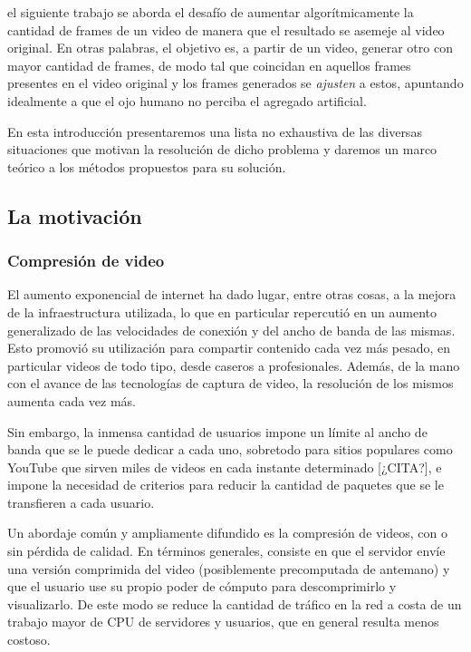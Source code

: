  el siguiente trabajo se aborda el desafío de aumentar algorítmicamente la cantidad de frames de un video de manera que el resultado se asemeje al video original. En otras palabras, el objetivo es, a partir de un video, generar otro con mayor cantidad de frames, de modo tal que coincidan en aquellos frames presentes en el video original y los frames generados se \emph{ajusten} a estos, apuntando idealmente a que el ojo humano no perciba el agregado artificial.

En esta introducción presentaremos una lista no exhaustiva de las diversas situaciones que motivan la resolución de dicho problema y daremos un marco teórico a los métodos propuestos para su solución.

\subsection{La motivación}
\subsubsection{Compresión de video}
El aumento exponencial de internet ha dado lugar, entre otras cosas\cite{TP2}, a la mejora de la infraestructura utilizada, lo que en particular repercutió en un aumento generalizado de las velocidades de conexión y del ancho de banda de las mismas. Esto promovió su utilización para compartir contenido cada vez más pesado, en particular videos de todo tipo, desde caseros a profesionales. Además, de la mano con el avance de las tecnologías de captura de video, la resolución de los mismos aumenta cada vez más.

Sin embargo, la inmensa cantidad de usuarios impone un límite al ancho de banda que se le puede dedicar a cada uno, sobretodo para sitios populares como YouTube que sirven miles de videos en cada instante determinado [¿CITA?], e impone la necesidad de criterios para reducir la cantidad de paquetes que se le transfieren a cada usuario.

Un abordaje común y ampliamente difundido es la compresión de videos, con o sin pérdida de calidad. En términos generales, consiste en que el servidor envíe una versión comprimida del video (posiblemente precomputada de antemano) y que el usuario use su propio poder de cómputo para descomprimirlo y visualizarlo. De este modo se reduce la cantidad de tráfico en la red a costa de un trabajo mayor de CPU de servidores y usuarios, que en general resulta menos costoso.

